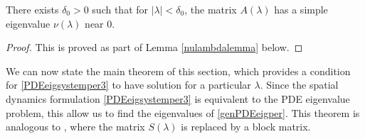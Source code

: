 \documentclass[thesis.tex]{subfiles}
\begin{document}
\begin{lemma}\label{nulambdalemmasimple}
There exists $\delta_0 > 0$ such that for $|\lambda| < \delta_0$, the matrix $A(\lambda)$ has a simple eigenvalue $\nu(\lambda)$ near 0.
\begin{proof}
This is proved as part of Lemma \ref{nulambdalemma} below.
\end{proof}
\end{lemma}

We can now state the main theorem of this section, which provides a condition for \cref{PDEeigsystemper3} to have solution for a particular $\lambda$. Since the spatial dynamics formulation \cref{PDEeigsystemper3} is equivalent to the PDE eigenvalue problem, this allow us to find the eigenvalues of \cref{genPDEeigper}. This theorem is analogous to \cite[Theorem 2]{Sandstede1998}, where the matrix $S(\lambda)$ is replaced by a block matrix.
\end{document}
